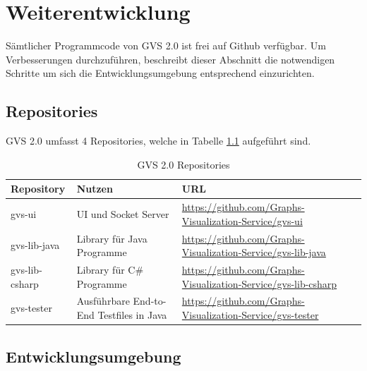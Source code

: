 \documentclass[11pt,a4paper,english,oneside]{book}
\numberwithin{equation}{chapter}
\begin{document}
	\chapter{Weiterentwicklung}
	Sämtlicher Programmcode von GVS 2.0 ist frei auf Github verfügbar. Um Verbesserungen durchzuführen, beschreibt dieser Abschnitt die notwendigen Schritte um sich die Entwicklungsumgebung entsprechend einzurichten.
	
	\section{Repositories}
	GVS 2.0 umfasst 4 Repositories, welche in Tabelle \ref{tbl:repos} aufgeführt sind.
	
	\begin{table}[h!]
		\centering
		\begin{tabularx}{\linewidth}{l l X}
			\toprule 
			Repository & Nutzen & URL \\
			\midrule
			gvs-ui & UI und Socket Server & \url{https://github.com/Graphs-Visualization-Service/gvs-ui}  \\
			gvs-lib-java & Library für Java Programme & \url{https://github.com/Graphs-Visualization-Service/gvs-lib-java} \\
			gvs-lib-csharp & Library für C\# Programme & \url{https://github.com/Graphs-Visualization-Service/gvs-lib-csharp} \\
			gvs-tester & Ausführbare End-to-End Testfiles in Java & \url{https://github.com/Graphs-Visualization-Service/gvs-tester} \\
			\bottomrule 
		\end{tabularx} 
		\caption{GVS 2.0 Repositories} 
		\label{tbl:repos}
	\end{table}

\clearpage

	\section{Entwicklungsumgebung}
	
\end{document}
